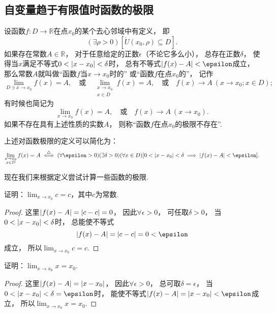 \subsection{自变量趋于有限值时函数的极限}
\begin{definition}\label{definition:极限.函数极限的定义1}
设函数\(f\colon D\to\mathbb{R}\)在点\(x_0\)的某个去心邻域中有定义，
即\[
	(\exists\rho>0)
	[\mathring{U}(x_0,\rho) \subseteq D].
\]
如果存在常数\(A\in\mathbb{R}\)，
对于任意给定的正数\(\epsilon\)（不论它多么小），
总存在正数\(\delta\)，
使得当\(x\)满足不等式\(0 < \abs{x-x_0} < \delta\)时，
总有不等式\(\abs{f(x)-A}<\epsilon\)成立，
那么常数\(A\)就叫做“函数\(f\)当\(x \to x_0\)时的”
或“函数\(f\)在点\(x_0\)的”，
记作\[
	\lim_{D \ni x \to x_0} f(x) = A,
	\quad\text{或}\quad
	\lim_{\substack{x \to x_0 \\ x \in D}} f(x) = A,
	\quad\text{或}\quad
	f(x) \to A\ (x \to x_0; x \in D);
\]
有时候也简记为\[
	\lim_{x \to x_0} f(x) = A,
	\quad\text{或}\quad
	f(x) \to A\ (x \to x_0).
\]
如果不存在具有上述性质的实数\(A\)，
则称“函数\(f\)在点\(x_0\)的极限不存在”.
\end{definition}

上述对函数极限的定义可以简化为：\[
	\lim_{\substack{x \to x_0 \\ x \in D}} f(x) = A
	\defiff
	(\forall \epsilon > 0)
	(\exists \delta > 0)
	(\forall x \in D)
	[0 < \abs{x - x_0} < \delta \implies \abs{f(x) - A} < \epsilon].
\]

现在我们来根据定义尝试计算一些函数的极限.

\begin{example}
证明：\(\lim_{x \to x_0} c = c\)，其中\(c\)为常数.
\begin{proof}
这里\(\abs{f(x) - A} = \abs{c - c} = 0\)，
因此\(\forall \epsilon > 0\)，
可任取\(\delta > 0\)，
当\(0 < \abs{x - x_0} < \delta\)时，
总能使不等式\[
	\abs{f(x) - A} = \abs{c - c} = 0 < \epsilon
\]成立，
所以\(\lim_{x \to x_0} c = c\).
\end{proof}
\end{example}

\begin{example}
证明：\(\lim_{x \to x_0} x = x_0\).
\begin{proof}
这里\(\abs{f(x) - A} = \abs{x - x_0}\)，
因此\(\forall \epsilon > 0\)，
总可取\(\delta = \epsilon\)，
当\(0 < \abs{x - x_0} < \delta = \epsilon\)时，
能使不等式\(\abs{f(x) - A} = \abs{x - x_0} < \epsilon\)成立，
所以\(\lim_{x \to x_0} x = x_0\).
\end{proof}
\end{example}

